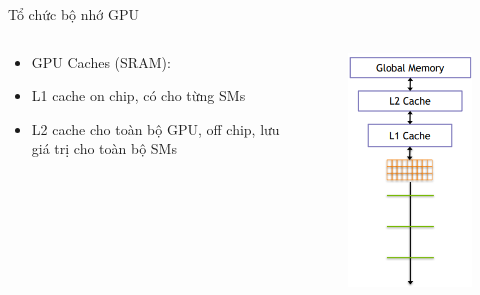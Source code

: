 \documentclass[10pt]{beamer}
\theoremstyle{remark}
\numberwithin{algocf}{section}
\numberwithin{equation}{section}
\numberwithin{dl}{section}
\numberwithin{figure}{section}
\begin{document}
\begin{frame}{Tổ chức bộ nhớ GPU}
    \begin{columns}[onlytextwidth]
        \begin{column}{0.5\linewidth}
            \begin{itemize}
                \item GPU Caches (SRAM):
                \item L1 cache on chip, có cho từng SMs 
                \item L2 cache cho toàn bộ GPU, off chip, lưu giá trị cho toàn bộ SMs
            \end{itemize}
        \end{column}
        \begin{column}{0.5\linewidth}
            \begin{figure}[H]
                \centering
                \includegraphics[height=0.9\textheight]{figures/CUDA/GPU_Caches_Memory.png}
            \end{figure}
        \end{column}
    \end{columns}
\end{frame}
\end{document}
